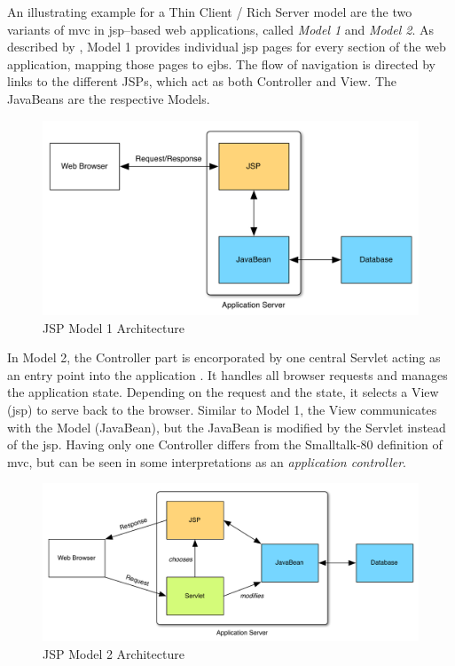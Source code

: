 An illustrating example for a Thin Client / Rich Server model are the two variants of \acl{mvc} in \ac{jsp}--based web applications, called \emph{Model 1} and \emph{Model 2}. As described by , Model 1 provides individual \ac{jsp} pages for every section of the web application, mapping those pages to \acp{ejb}. The flow of navigation is directed by links to the different JSPs, which act as both Controller and View. The JavaBeans are the respective Models.

\begin{figure}[H]
	\centering
	\includegraphics[width=14cm]{images/model1.pdf}
	\caption{JSP Model 1 Architecture}
	\label{fig:model1}
\end{figure}

In Model 2\label{term:model2}, the Controller part is encorporated by one central Servlet acting as an entry point into the application \cite[pp. 446 f.]{johnson}. It handles all browser requests and manages the application state. Depending on the request and the state, it selects a View (\ac{jsp}) to serve back to the browser. Similar to Model 1, the View communicates with the Model (JavaBean), but the JavaBean is modified by the Servlet instead of the \ac{jsp}. Having only one Controller differs from the \mbox{Smalltalk-80} definition of \ac{mvc}, but can be seen in some interpretations as an \emph{application controller}.

\begin{figure}[H]
	\centering
	\includegraphics[width=16cm]{images/model2.pdf}
	\caption{JSP Model 2 Architecture}
	\label{fig:model2}
\end{figure}

